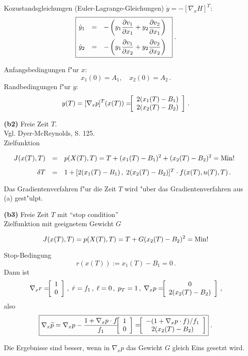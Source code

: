 \documentclass[12pt,a4paper,twoside,leqno]{article}
\begin{document}
Kozustandsgleichungen ({\sc Euler-Lagrange}-Gleichungen)
$\dot{y} =  - [\nabla_x H]^T$:
\[
\fbox{$
\ba{.}{rcl}
\dot{y}_1 &=& \dis
-\left(y_1\frac{\da v_1}{\da x_1} + y_2\frac{\da v_2}{\da x_1}\right)\\[4mm]
\dot{y}_2 &=& \dis
- \left(y_1\frac{\da v_1}{\da x_2} + y_2\frac{\da v_2}{\da x_2}\right)
\ea{.}
$}\; .
\]

Anfangsbedingungen f"ur $x$:
\[
x_1(0) = A_1, \quad x_2(0) = A_2\, .
\]
Randbedingungen f"ur $y$:
\[
y(T) = [\nabla_x p]^T(x(T))
= \ba{[}{c} 2(x_1(T) - B_1)\\ 2(x_2(T) - B_2)\ea{]}\, .
\]
\par
\vspace{1mm}
{\bf (b2)} Freie Zeit $T$.\\
Vgl. {\sc Dyer-McReynolds}, S. 125.\\
%
Zielfunktion

\[
\ba{.}{rcl}
J(x(T),T)
&=& \dis p(X(T),T) = T + (x_1(T) - B_1)^2 + (x_2(T) - B_2)^2 = \Min!\\[3mm]
\delta T &=& 1 + [2(x_1(T) - B_1)\,, \; 2(x_2(T) - B_2)]^T\cdot f(x(T),u(T),T)
\,.
\ea{.}
\]

Das Gradientenverfahren f"ur die Zeit $T$ wird "uber das Gradientenverfahren aus
(a) gest"ulpt.

\par
\vspace{1mm}
{\bf (b3)} Freie Zeit $T$ mit ``stop condition''\\
Zielfunktion mit geeignetem Gewicht $G$

\[
J(x(T),T) = \dis p(X(T),T) = T + G(x_2(T) - B_2)^2 = \Min!
\]

Stop-Bedingung
\[
r(x(T)) := x_1(T) - B_1 = 0\, .
\]
Dann ist
\[
\nabla_xr = \ba{[}{c}1\\0\ea{]}\,,\; \dot{r} =  f_1\,,\;
\ell = 0\,,\; p_T = 1\,, \;
\nabla_xp = \ba{[}{c}0\\ 2(x_2(T) - B_2)\ea{]}\,,
\]
also
\[
\fbox{$ \dis
\nabla_x\wi{p} =
\nabla_xp - \frac{1 + \nabla_xp\cdot f}{f_1}\ba{[}{c}1\\0\ea{]}
= \ba{[}{c}-(1 + \nabla_xp\cdot f)/f_1\\2(x_2(T) - B_2)\ea{]}
$}\; .
\]

Die Ergebnisse sind besser, wenn in $\nabla_xp$ das Gewicht $G$ gleich Eins
gesetzt wird.
\end{document}
